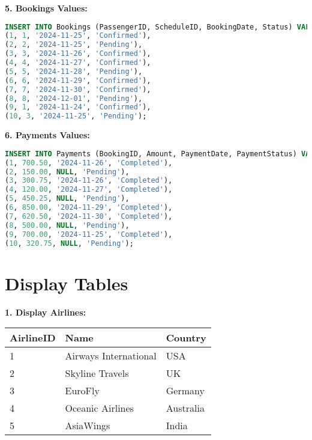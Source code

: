 \documentclass[14pt,a4paper]{extarticle}
\begin{document}
\textbf{5. Bookings Values:}
\begin{lstlisting}[language=SQL]
INSERT INTO Bookings (PassengerID, ScheduleID, BookingDate, Status) VALUES
(1, 1, '2024-11-25', 'Confirmed'),
(2, 2, '2024-11-25', 'Pending'),
(3, 3, '2024-11-26', 'Confirmed'),
(4, 4, '2024-11-27', 'Confirmed'),
(5, 5, '2024-11-28', 'Pending'),
(6, 6, '2024-11-29', 'Confirmed'),
(7, 7, '2024-11-30', 'Confirmed'),
(8, 8, '2024-12-01', 'Pending'),
(9, 1, '2024-11-24', 'Confirmed'),
(10, 3, '2024-11-25', 'Pending');
\end{lstlisting}

\textbf{6. Payments Values:}
\begin{lstlisting}[language=SQL]
INSERT INTO Payments (BookingID, Amount, PaymentDate, PaymentStatus) VALUES
(1, 700.50, '2024-11-26', 'Completed'),
(2, 150.00, NULL, 'Pending'),
(3, 300.75, '2024-11-26', 'Completed'),
(4, 120.00, '2024-11-27', 'Completed'),
(5, 450.25, NULL, 'Pending'),
(6, 850.00, '2024-11-29', 'Completed'),
(7, 620.50, '2024-11-30', 'Completed'),
(8, 500.00, NULL, 'Pending'),
(9, 700.00, '2024-11-25', 'Completed'),
(10, 320.75, NULL, 'Pending');
\end{lstlisting}

\section{Display Tables}

\textbf{1. Display Airlines:}
\begin{table}[h!]
\centering
\begin{tabular}{|l|l|l|}
    \hline
    \textbf{AirlineID} & \textbf{Name} & \textbf{Country} \\ \hline
    1 & Airways International & USA \\ \hline
    2 & Skyline Travels        & UK  \\ \hline
    3 & EuroFly                & Germany \\ \hline
    4 & Oceanic Airlines       & Australia \\ \hline
    5 & AsiaWings              & India \\ \hline
\end{tabular}
\end{table}
\end{document}
